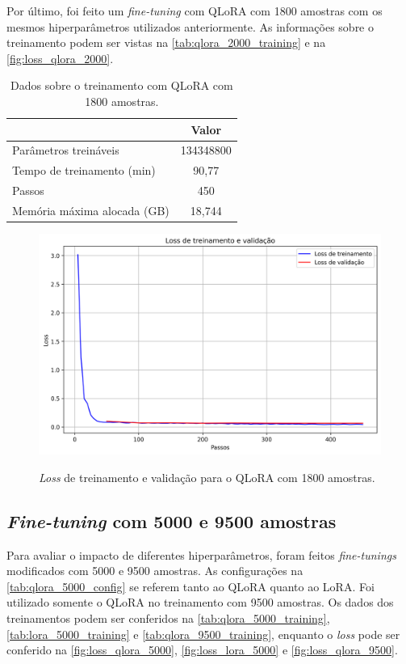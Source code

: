 Por último, foi feito um \textit{fine-tuning} com \ac{QLoRA} com 1800 amostras com os mesmos hiperparâmetros utilizados
anteriormente. As informações sobre o treinamento podem ser vistas na \autoref{tab:qlora_2000_training} e na
\autoref{fig:loss_qlora_2000}.

\clearpage

\begin{table}[ht]
    \caption{\small Dados sobre o treinamento com \ac{QLoRA} com 1800 amostras.}
    \centering
    \begin{tabular}{l|c}
        \hline
                                    & Valor     \\ \hline
        Parâmetros treináveis       & 134348800 \\
        Tempo de treinamento (min)  & 90,77     \\
        Passos                      & 450       \\
        Memória máxima alocada (GB) & 18,744    \\ \hline
    \end{tabular}
    \label{tab:qlora_2000_training}
\end{table}

\begin{figure}[ht]
    \centering
    \caption{\small \textit{Loss} de treinamento e validação para o \ac{QLoRA} com 1800 amostras.}
    \includegraphics[width=0.725\columnwidth,keepaspectratio]{images/loss_qlora_2000.png}
    \label{fig:loss_qlora_2000}
\end{figure}

\subsection{\textit{Fine-tuning} com 5000 e 9500 amostras}

Para avaliar o impacto de diferentes hiperparâmetros, foram feitos \textit{fine-tunings} modificados com 5000 e 9500
amostras. As configurações na \autoref{tab:qlora_5000_config} se referem tanto ao \ac{QLoRA} quanto ao \ac{LoRA}. Foi
utilizado somente o \ac{QLoRA} no treinamento com 9500 amostras. Os dados dos treinamentos podem ser conferidos na
\autoref{tab:qlora_5000_training}, \autoref{tab:lora_5000_training} e \autoref{tab:qlora_9500_training}, enquanto o
\textit{loss} pode ser conferido na \autoref{fig:loss_qlora_5000}, \autoref{fig:loss_lora_5000} e
\autoref{fig:loss_qlora_9500}.

